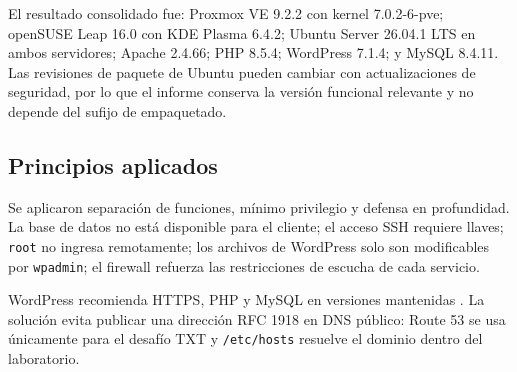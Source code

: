 El resultado consolidado fue: Proxmox VE 9.2.2 con kernel 7.0.2-6-pve; openSUSE Leap 16.0 con KDE Plasma 6.4.2; Ubuntu Server 26.04.1 LTS en ambos servidores; Apache 2.4.66; PHP 8.5.4; WordPress 7.1.4; y MySQL 8.4.11. Las revisiones de paquete de Ubuntu pueden cambiar con actualizaciones de seguridad, por lo que el informe conserva la versión funcional relevante y no depende del sufijo de empaquetado.

\subsection{Principios aplicados}

Se aplicaron separación de funciones, mínimo privilegio y defensa en profundidad. La base de datos no está disponible para el cliente; el acceso SSH requiere llaves; \texttt{root} no ingresa remotamente; los archivos de WordPress solo son modificables por \texttt{wpadmin}; el firewall refuerza las restricciones de escucha de cada servicio.

WordPress recomienda HTTPS, PHP y MySQL en versiones mantenidas \cite{wordpress-requirements}. La solución evita publicar una dirección RFC 1918 en DNS público: Route 53 se usa únicamente para el desafío TXT y \texttt{/etc/hosts} resuelve el dominio dentro del laboratorio.
